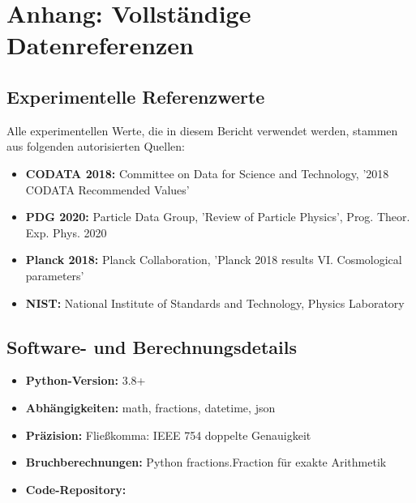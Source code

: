 \documentclass[12pt,a4paper]{report}
\begin{document}
	\section{Anhang: Vollständige Datenreferenzen}
	
	\subsection{Experimentelle Referenzwerte}
	
	Alle experimentellen Werte, die in diesem Bericht verwendet werden, stammen aus folgenden autorisierten Quellen:
	
	\begin{itemize}
		\item \textbf{CODATA 2018:} Committee on Data for Science and Technology, '2018 CODATA Recommended Values'
		\item \textbf{PDG 2020:} Particle Data Group, 'Review of Particle Physics', Prog. Theor. Exp. Phys. 2020
		\item \textbf{Planck 2018:} Planck Collaboration, 'Planck 2018 results VI. Cosmological parameters'
		\item \textbf{NIST:} National Institute of Standards and Technology, Physics Laboratory
	\end{itemize}
	
	\subsection{Software- und Berechnungsdetails}
	
	\begin{itemize}
		\item \textbf{Python-Version:} 3.8+
		\item \textbf{Abhängigkeiten:} math, fractions, datetime, json
		\item \textbf{Präzision:} Fließkomma: IEEE 754 doppelte Genauigkeit
		\item \textbf{Bruchberechnungen:} Python fractions.Fraction für exakte Arithmetik
		\item \textbf{Code-Repository:} 
	\end{itemize}
	
\end{document}
